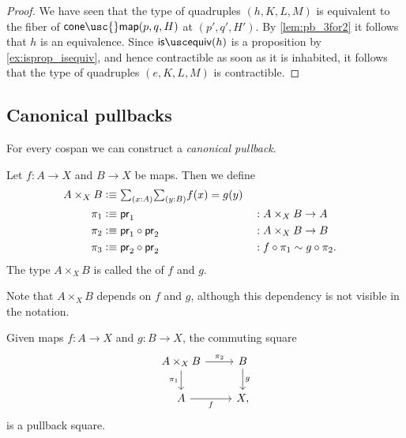 \begin{proof}
We have seen that the type of quadruples $(h,K,L,M)$ is equivalent to the fiber of $\mathsf{cone\usc{}map}(p,q,H)$ at $(p',q',H')$. By \cref{lem:pb_3for2} it follows that $h$ is an equivalence. Since $\isequiv(h)$ is a proposition by \cref{ex:isprop_isequiv}, and hence contractible as soon as it is inhabited, it follows that the type of quadruples $(e,K,L,M)$ is contractible. 
\end{proof}

\subsection{Canonical pullbacks}

For every cospan we can construct a \emph{canonical pullback}.

\begin{defn}
Let $f:A\to X$ and $B\to X$ be maps. Then we define
\begin{align*}
A\times_X B & \defeq \sm{x:A}{y:B}f(x)=g(y) \\
\pi_1 & \defeq \proj 1 & & : A\times_X B\to A \\
\pi_2 & \defeq \proj 1\circ\proj 2 & & : A\times_X B\to B\\
\pi_3 & \defeq \proj 2\circ\proj 2 & & : f\circ \pi_1 \htpy g\circ\pi_2.
\end{align*}
The type $A\times_X B$ is called the  of $f$ and $g$.
\end{defn}

Note that $A\times_X B$ depends on $f$ and $g$, although this dependency is not visible in the notation.

\begin{thm}\label{thm:canonical-pullback}
Given maps $f:A\to X$ and $g:B\to X$, the commuting square
\begin{equation*}
\begin{tikzcd}
A\times_X B \arrow[r,"\pi_2"] \arrow[d,swap,"\pi_1"] & B \arrow[d,"g"] \\
A \arrow[r,swap,"f"] & X,
\end{tikzcd}
\end{equation*}
is a pullback square.
\end{thm}

